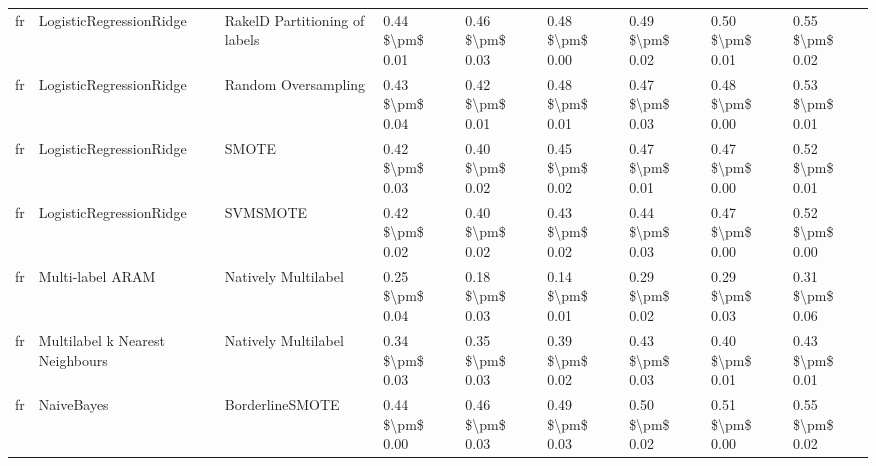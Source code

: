 \begin{tabular}{lllllllll}
      fr &         LogisticRegressionRidge & RakelD Partitioning of labels & 0.44 \$\textbackslash pm\$ 0.01 &           0.46 \$\textbackslash pm\$ 0.03 &       0.48 \$\textbackslash pm\$ 0.00 &        0.49 \$\textbackslash pm\$ 0.02 &                         0.50 \$\textbackslash pm\$ 0.01 &     0.55 \$\textbackslash pm\$ 0.02 \\
      fr &         LogisticRegressionRidge &           Random Oversampling & 0.43 \$\textbackslash pm\$ 0.04 &           0.42 \$\textbackslash pm\$ 0.01 &       0.48 \$\textbackslash pm\$ 0.01 &        0.47 \$\textbackslash pm\$ 0.03 &                         0.48 \$\textbackslash pm\$ 0.00 &     0.53 \$\textbackslash pm\$ 0.01 \\
      fr &         LogisticRegressionRidge &                         SMOTE & 0.42 \$\textbackslash pm\$ 0.03 &           0.40 \$\textbackslash pm\$ 0.02 &       0.45 \$\textbackslash pm\$ 0.02 &        0.47 \$\textbackslash pm\$ 0.01 &                         0.47 \$\textbackslash pm\$ 0.00 &     0.52 \$\textbackslash pm\$ 0.01 \\
      fr &         LogisticRegressionRidge &                      SVMSMOTE & 0.42 \$\textbackslash pm\$ 0.02 &           0.40 \$\textbackslash pm\$ 0.02 &       0.43 \$\textbackslash pm\$ 0.02 &        0.44 \$\textbackslash pm\$ 0.03 &                         0.47 \$\textbackslash pm\$ 0.00 &     0.52 \$\textbackslash pm\$ 0.00 \\
      fr &                Multi-label ARAM &           Natively Multilabel & 0.25 \$\textbackslash pm\$ 0.04 &           0.18 \$\textbackslash pm\$ 0.03 &       0.14 \$\textbackslash pm\$ 0.01 &        0.29 \$\textbackslash pm\$ 0.02 &                         0.29 \$\textbackslash pm\$ 0.03 &     0.31 \$\textbackslash pm\$ 0.06 \\
      fr & Multilabel k Nearest Neighbours &           Natively Multilabel & 0.34 \$\textbackslash pm\$ 0.03 &           0.35 \$\textbackslash pm\$ 0.03 &       0.39 \$\textbackslash pm\$ 0.02 &        0.43 \$\textbackslash pm\$ 0.03 &                         0.40 \$\textbackslash pm\$ 0.01 &     0.43 \$\textbackslash pm\$ 0.01 \\
      fr &                      NaiveBayes &               BorderlineSMOTE & 0.44 \$\textbackslash pm\$ 0.00 &           0.46 \$\textbackslash pm\$ 0.03 &       0.49 \$\textbackslash pm\$ 0.03 &        0.50 \$\textbackslash pm\$ 0.02 &                         0.51 \$\textbackslash pm\$ 0.00 &     0.55 \$\textbackslash pm\$ 0.02 \\

\end{tabular}

